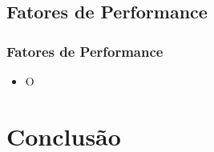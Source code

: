 \documentclass[xcolor=dvipsnames, aspectratio=169]{beamer}
\begin{document}
    \subsection[Introdução]{Fatores de Performance} 
    \begin{frame}
    \frametitle{Fatores de Performance}
        \begin{itemize}
            \item O
        \end{itemize}
    \end{frame}

\section[Conclusão]{Conclusão} 
\end{document}
